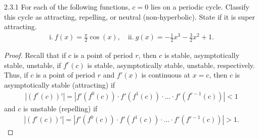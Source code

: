 \begin{problem}{2.3.1}
  For each of the following functions, $c=0$ lies on a periodic cycle. Classify
  this cycle as attracting, repelling, or neutral (non-hyperbolic). State if
  it is super attracting.
  \begin{align*}
    \text{i}.\  f(x) = \frac{\pi}{2} \cos(x),\quad \text{ii}.\ g(x) = -\frac{1}{2}x^3 - \frac{3}{2}x^2 + 1.
  \end{align*}
\end{problem}

\begin{proof}
  Recall that if $c$ is a point of period $r$, then $c$ is stable, asymptotically stable, unstable,
  if $f^r(c)$ is stable, asymptotically stable, unstable, respectively. Thus,
  if $c$ is a point of period $r$ and $f'(x)$ is continuous at $x=c$,
  then $c$ is asymptotically stable (attracting) if
  \begin{align*}
    \left|\left(f^r(c) \right) '\right| = \left|f'(f^0(c))\cdot f'(f^1(c)) \cdot \dots \cdot f'(f^{r-1}(c))\right| < 1
  \end{align*}
  and $c$ is unstable (repelling) if
  \begin{align*}
    \left|\left(f^r(c) \right) '\right| = \left|f'(f^0(c))\cdot f'(f^1(c)) \cdot \dots \cdot f'(f^{r-1}(c))\right| > 1.
  \end{align*}


\end{proof}
